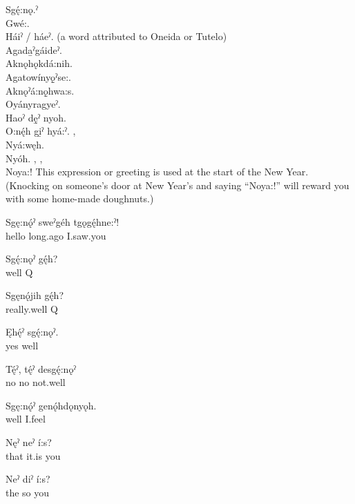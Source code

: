 \begin{multicols}{2}
Sgę́:nǫ.ˀ \\
Gwé:. \\
Háiˀ / háeˀ.  (a word attributed to Oneida or Tutelo)\\
Agada̱ˀgáideˀ. \\
Aknǫhǫkdá:nih. \\
Agatowínyǫ̱ˀse:. \\
Aknǫˀá:nǫ̱hwa:s. \\
Oyányragyeˀ. \\
Haoˀ dę̱ˀ nyoh. \\
O:nę́h gi̱ˀ hyá:ˀ. , \\
Nyá:węh. \\
Nyóh. , , \\
Noya:!  This expression or greeting is used at the start of the New Year. (Knocking on someone’s door at New Year’s and saying “Noya:!” will reward you with some home-made doughnuts.)

\end{multicols}
\largerpage
\begin{multicols}{2}

\ea
\gll Sgę:nǫ́ˀ sweˀgéh tgǫgę́hne:ˀ!\\
hello long.ago I.saw.you\\
\glt \mbox{}
\z

\ea
\gll Sgę́:nǫˀ gę́h?\\
well Q\\
\glt {}
\z

\ea
\gll Sgęnǫ́jih gę́h?\\
really.well Q\\
\glt {}
\z

\ea
\gll Ęhę́ˀ sgę́:nǫˀ.\\
yes well\\
\glt {}
\z

\ea
\gll Tę́ˀ, tę́ˀ desgę́:nǫˀ\\
no no not.well\\
\glt {}
\z

\largerpage
\ea
\gll Sgę:nǫ́ˀ genǫ́hdǫnyǫh.\\
well I.feel\\
\glt {}
\z

\ea
\gll Nęˀ neˀ í:s?\\
that it.is you\\
\glt {}
\z

\ea
\gll Neˀ diˀ í:s?\\
the so you\\
\glt {}
\z
\end{multicols}


